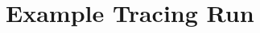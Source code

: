 \documentclass[mathserif,10pt]{beamer}
\begin{document}
\section{Example Tracing Run}
\frame
{
  \begin{figure}[h]
  \centering
  \end{figure}
}
\frame
{
  \begin{figure}[h]
  \centering
  \end{figure}
}
\end{document}
